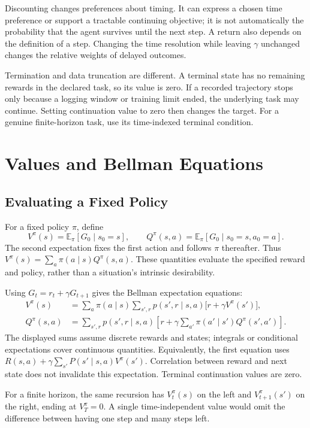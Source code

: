 Discounting changes preferences about timing. It can express a chosen time preference or support a tractable continuing objective; it is not automatically the probability that the agent survives until the next step. A return also depends on the definition of a step. Changing the time resolution while leaving $\gamma$ unchanged changes the relative weights of delayed outcomes.

Termination and data truncation are different. A terminal state has no remaining rewards in the declared task, so its value is zero. If a recorded trajectory stops only because a logging window or training limit ended, the underlying task may continue. Setting continuation value to zero then changes the target. For a genuine finite-horizon task, use its time-indexed terminal condition.

\section{Values and Bellman Equations}

\subsection{Evaluating a Fixed Policy}

For a fixed policy $\pi$, define
\[
V^\pi(s)=\mathbb E_\pi[G_0\mid s_0=s],
\qquad
Q^\pi(s,a)=\mathbb E_\pi[G_0\mid s_0=s,a_0=a].
\]
The second expectation fixes the first action and follows $\pi$ thereafter. Thus $V^\pi(s)=\sum_a\pi(a\mid s)Q^\pi(s,a)$. These quantities evaluate the specified reward and policy, rather than a situation's intrinsic desirability.

Using $G_t=r_t+\gamma G_{t+1}$ gives the Bellman expectation equations:
\begin{align*}
V^\pi(s)
&=\sum_a\pi(a\mid s)\sum_{s',r}p(s',r\mid s,a)
\bigl[r+\gamma V^\pi(s')\bigr],\\
Q^\pi(s,a)
&=\sum_{s',r}p(s',r\mid s,a)
\left[r+\gamma\sum_{a'}\pi(a'\mid s')Q^\pi(s',a')\right].
\end{align*}
The displayed sums assume discrete rewards and states; integrals or conditional expectations cover continuous quantities. Equivalently, the first equation uses $R(s,a)+\gamma\sum_{s'}P(s'\mid s,a)V^\pi(s')$. Correlation between reward and next state does not invalidate this expectation. Terminal continuation values are zero.

For a finite horizon, the same recursion has $V_t^\pi(s)$ on the left and $V_{t+1}^\pi(s')$ on the right, ending at $V_T^\pi=0$. A single time-independent value would omit the difference between having one step and many steps left.

